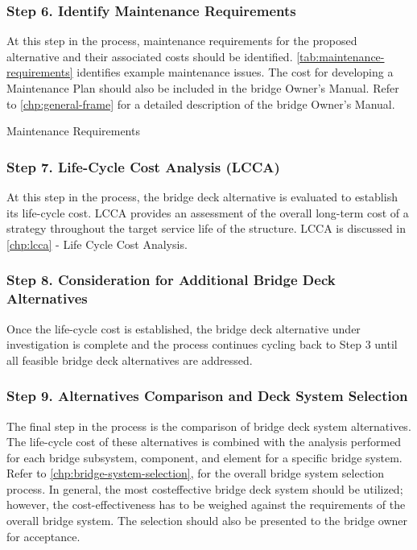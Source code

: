 \subsubsection*{Step 6. Identify Maintenance Requirements}
At this step in the process, maintenance requirements for the proposed alternative and their associated costs should be identified. \cref{tab:maintenance-requirements} identifies example maintenance issues. The cost for developing a Maintenance Plan should also be included in the bridge Owner’s Manual. Refer to \cref{chp:general-frame} for a detailed description of the bridge Owner’s Manual.

\begin{table}
  \caption{Maintenance Requirements}
  \label{tab:maintenance-requirements}
\end{table}

\subsubsection*{Step 7. Life-Cycle Cost Analysis (LCCA)}
At this step in the process, the bridge deck alternative is evaluated to establish its life-cycle cost. LCCA provides an assessment of the overall long-term cost of a strategy throughout the target service life of the structure. LCCA is discussed in \cref{chp:lcca} - Life Cycle Cost Analysis.

\subsubsection*{Step 8. Consideration for Additional Bridge Deck Alternatives}
Once the life-cycle cost is established, the bridge deck alternative under investigation is complete and the process continues cycling back to Step 3 until all feasible bridge deck alternatives are addressed.

\subsubsection*{Step 9. Alternatives Comparison and Deck System Selection}
The final step in the process is the comparison of bridge deck system alternatives. The life-cycle cost of these alternatives is combined with the analysis performed for each bridge subsystem, component, and element for a specific bridge system. Refer to \cref{chp:bridge-system-selection}, for the overall bridge system selection process. In general, the most costeffective bridge deck system should be utilized; however, the cost-effectiveness has to be weighed against the requirements of the overall bridge system. The selection should also be presented to the bridge owner for acceptance.